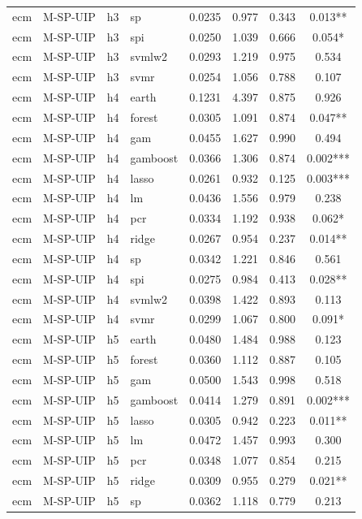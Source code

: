 \begin{ThreePartTable}
\begin{longtable}[t]{llclcccc}
ecm & M-SP-UIP & h3 & sp & 0.0235 & 0.977 & 0.343 & 0.013**\\
ecm & M-SP-UIP & h3 & spi & 0.0250 & 1.039 & 0.666 & 0.054*\\
ecm & M-SP-UIP & h3 & svmlw2 & 0.0293 & 1.219 & 0.975 & 0.534\\
ecm & M-SP-UIP & h3 & svmr & 0.0254 & 1.056 & 0.788 & 0.107\\
\addlinespace
ecm & M-SP-UIP & h4 & earth & 0.1231 & 4.397 & 0.875 & 0.926\\
ecm & M-SP-UIP & h4 & forest & 0.0305 & 1.091 & 0.874 & 0.047**\\
ecm & M-SP-UIP & h4 & gam & 0.0455 & 1.627 & 0.990 & 0.494\\
ecm & M-SP-UIP & h4 & gamboost & 0.0366 & 1.306 & 0.874 & 0.002***\\
ecm & M-SP-UIP & h4 & lasso & 0.0261 & 0.932 & 0.125 & 0.003***\\
ecm & M-SP-UIP & h4 & lm & 0.0436 & 1.556 & 0.979 & 0.238\\
ecm & M-SP-UIP & h4 & pcr & 0.0334 & 1.192 & 0.938 & 0.062*\\
ecm & M-SP-UIP & h4 & ridge & 0.0267 & 0.954 & 0.237 & 0.014**\\
ecm & M-SP-UIP & h4 & sp & 0.0342 & 1.221 & 0.846 & 0.561\\
ecm & M-SP-UIP & h4 & spi & 0.0275 & 0.984 & 0.413 & 0.028**\\
ecm & M-SP-UIP & h4 & svmlw2 & 0.0398 & 1.422 & 0.893 & 0.113\\
ecm & M-SP-UIP & h4 & svmr & 0.0299 & 1.067 & 0.800 & 0.091*\\
\addlinespace
ecm & M-SP-UIP & h5 & earth & 0.0480 & 1.484 & 0.988 & 0.123\\
ecm & M-SP-UIP & h5 & forest & 0.0360 & 1.112 & 0.887 & 0.105\\
ecm & M-SP-UIP & h5 & gam & 0.0500 & 1.543 & 0.998 & 0.518\\
ecm & M-SP-UIP & h5 & gamboost & 0.0414 & 1.279 & 0.891 & 0.002***\\
ecm & M-SP-UIP & h5 & lasso & 0.0305 & 0.942 & 0.223 & 0.011**\\
ecm & M-SP-UIP & h5 & lm & 0.0472 & 1.457 & 0.993 & 0.300\\
ecm & M-SP-UIP & h5 & pcr & 0.0348 & 1.077 & 0.854 & 0.215\\
ecm & M-SP-UIP & h5 & ridge & 0.0309 & 0.955 & 0.279 & 0.021**\\
ecm & M-SP-UIP & h5 & sp & 0.0362 & 1.118 & 0.779 & 0.213\\

\end{longtable}
\end{ThreePartTable}
